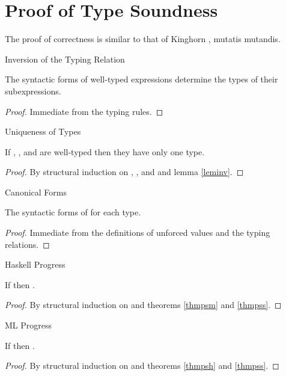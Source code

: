 \chapter{Proof of Type Soundness}

The proof of correctness is similar to that of Kinghorn \cite{kinghorn07}, mutatis mutandis.

\begin{lemma}{Inversion of the Typing Relation}

\label{leminv}
The syntactic forms of well-typed expressions determine the types of their subexpressions.
\begin{proof}
Immediate from the typing rules.
\end{proof}
\end{lemma}

\begin{lemma}{Uniqueness of Types}

\label{lemuni}
If \varexph, \varexpm, and \varexps are well-typed then they have only one type.
\begin{proof}
By structural induction on \varexph, \varexpm, and \varexps and lemma \ref{leminv}.
\end{proof}
\end{lemma}

\begin{lemma}{Canonical Forms}

\label{lemcan}
The syntactic forms of \prouvs for each type.
\begin{proof}
Immediate from the definitions of unforced values and the typing relations.
\end{proof}
\end{lemma}

\begin{theorem}{Haskell Progress}

\label{thmpsh}
If \judeh{}{\first{\varexph}}{\vartyh} then \pshyp{\first{\varexph}}{\second{\varexph}}.
\begin{proof}
By structural induction on \first{\varexph} and theorems \ref{thmpsm} and \ref{thmpss}.
\end{proof}
\end{theorem}

\begin{theorem}{ML Progress}

\label{thmpsm}
If \judem{}{\first{\varexpm}}{\vartym} then \pshyp{\first{\varexpm}}{\second{\varexpm}}.
\begin{proof}
By structural induction on \first{\varexpm} and theorems \ref{thmpsh} and \ref{thmpss}.
\end{proof}
\end{theorem}

